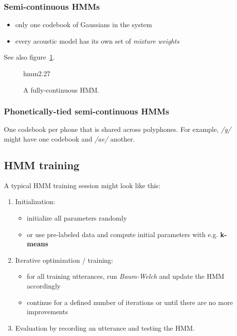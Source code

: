 \documentclass[11pt]{article}
\begin{document}
\subsubsection{Semi-continuous HMMs}
\begin{itemize}
    \item only one codebook of Gaussians in the system
    \item every acoustic model has its own set of \textit{mixture weights}
\end{itemize}
See also figure~\ref{fig:semiContinuousHMMs}.
\begin{figure}[htb]
    \begin{minipage}{\linewidth}
        \vspace{6cm}
        \hfill \scriptsize hmm2.27
    \end{minipage}
    \caption{\label{fig:semiContinuousHMMs} A fully-continuous HMM.}
\end{figure}

\subsubsection{Phonetically-tied semi-continuous HMMs}
One codebook per phone that is shared across polyphones. For example, \textit{/g/} might have one codebook and \textit{/ae/} another.

\subsection{HMM training}

A typical HMM training session might look like this:
\begin{enumerate}
    \item Initialization:
        \begin{itemize}
            \item initialize all parameters randomly
            \item or use pre-labeled data and compute initial parameters with e.g. \textbf{k-means}
        \end{itemize}
    \item Iterative optimization / training:
        \begin{itemize}
            \item for all training utterances, run \textit{Baum-Welch} and update the HMM accordingly
            \item continue for a defined number of iterations or until there are no more improvements
        \end{itemize}
    \item Evaluation by recording an utterance and testing the HMM.
\end{enumerate}
\end{document}
